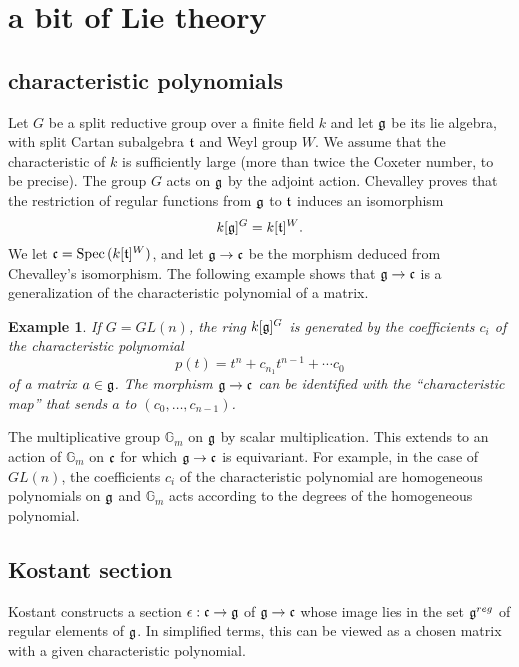 \documentclass[brochure,english,12pt]{bourbaki}
\newtheorem{example}[equation]{Example}
\def\op#1{{\operatorname{#1}}}
\newcommand{\ring}[1]{\mathbb{#1}}
\def\g{\frak{g}}
\def\t{\frak{t}}
\def\c{\frak{c}}
\begin{document}
\section{a bit of Lie theory}



\subsection{characteristic polynomials}



Let $G$ be a split reductive group over a finite field $k$ and let
$\g$ be its lie algebra, with split Cartan subalgebra $\t$ and Weyl
group $W$.  We assume that the characteristic of $k$ is sufficiently
large (more than twice the Coxeter number, to be precise).  The group
$G$ acts on $\g$ by the adjoint action.  Chevalley proves that the restriction  of regular
functions from $\g$ to $\t$ induces an isomorphism
\[
k[\g]^G = k[\t]^W.
\]
We let $\c =  \op{Spec}\,(k[\t]^W)$, and let $\g\to\c$ be the morphism deduced from
Chevalley's isomorphism.  The following example shows that $\g\to\c$ is a generalization
of the characteristic polynomial of a matrix.

\begin{example}
If $G=GL(n)$, the ring $k[\g]^G$ is generated by the coefficients $c_i$ of the characteristic
polynomial 
\begin{equation}
p(t)=t^n + c_{n_1} t^{n-1} +\cdots c_0
\end{equation}
of a matrix $a\in \g$.  The morphism $\g\to\c$ can be identified with
the ``characteristic map'' that sends $a$ to $(c_0,\ldots,c_{n-1})$.
\end{example}

The multiplicative group $\ring{G}_m$ on $\g$ by scalar multiplication.  This extends to an action
of $\ring{G}_m$ on $\c$ for which $\g\to\c$ is equivariant.  For example, in
the case of $GL(n)$, the coefficients $c_i$ of the characteristic
polynomial are homogeneous polynomials on $\g$ and $\ring{G}_m$ acts
according to the degrees of the homogeneous polynomial.

\subsection{Kostant section}

Kostant constructs a section $\epsilon:\c\to\g$ of $\g\to\c$ whose image lies in the set $\g^{reg}$ 
of regular elements
of $\g$.  In simplified terms, this can be viewed as a chosen matrix with a given characteristic polynomial.
\end{document}
